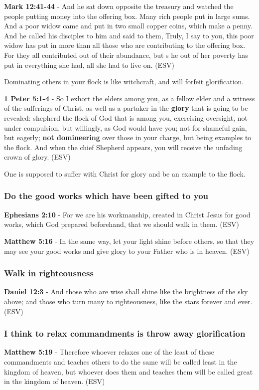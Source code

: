 \documentclass[11pt]{article}
\begin{document}
\textbf{Mark 12:41-44} -  And he sat down opposite the treasury and watched the people putting money into the offering box.  Many rich people put in large sums.  And a poor widow came and put in two small copper coins, which make a penny.  And he called his disciples to him and said to them, Truly, I say to you, this poor widow has put in more than all those who are contributing to the offering box.  For they all contributed out of their abundance, but s he out of her poverty has put in everything she had, all she had to live on.  (ESV)

Dominating others in your flock is like witchcraft, and will forfeit glorification.

\textbf{1 Peter 5:1-4} -  So I exhort the elders among you, as a fellow elder and a witness of the sufferings of Christ, as well as a partaker in the \textbf{glory} that is going to be revealed: shepherd the flock of God that is among you, exercising oversight, not under compulsion, but willingly, as God would have you; not for shameful gain, but eagerly; \textbf{not domineering} over those in your charge, but being examples to the flock.  And when the chief Shepherd appears, you will receive the unfading crown of glory.  (ESV)

One is supposed to suffer with Christ for glory and be an example to the flock.

\subsubsection{Do the good works which have been gifted to you}
\label{sec:org1f0cb3e}
\textbf{Ephesians 2:10} - For we are his workmanship, created in Christ Jesus for good works, which God prepared beforehand, that we should walk in them.  (ESV)

\textbf{Matthew 5:16} - In the same way, let your light shine before others, so that they may see your good works and give glory to your Father who is in heaven.  (ESV)

\subsubsection{Walk in righteousness}
\label{sec:org478e462}

\textbf{Daniel 12:3} -  And those who are wise shall shine like the brightness of the sky above; and those who turn many to righteousness, like the stars forever and ever.  (ESV)

\subsubsection{I think to relax commandments is throw away glorification}
\label{sec:orgc931976}
\textbf{Matthew 5:19} -  Therefore whoever relaxes one of the least of these commandments and teaches others to do the same will be called least in the kingdom of heaven, but whoever does them and teaches them will be called great in the kingdom of heaven.  (ESV)
\end{document}
